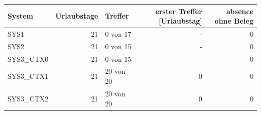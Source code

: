 \begin{tabular}{lrlrr}
\toprule
System & Urlaubstage & Treffer & erster Treffer [Urlaubstag] & absence ohne Beleg \\
\midrule
SYS1 & 21 & 0 von 17 & - & 0 \\
SYS2 & 21 & 0 von 15 & - & 0 \\
SYS3\_CTX0 & 21 & 0 von 15 & - & 0 \\
SYS3\_CTX1 & 21 & 20 von 20 & 0 & 0 \\
SYS3\_CTX2 & 21 & 20 von 20 & 0 & 0 \\
\bottomrule
\end{tabular}
